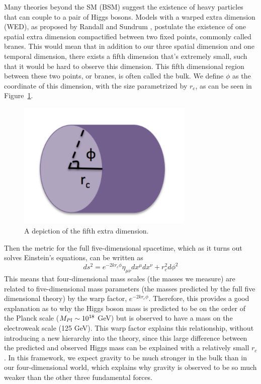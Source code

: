 Many theories beyond the SM (BSM) suggest \ifdefined{}\else{ } \fi the existence of heavy particles that can couple to a pair of Higgs bosons. 
Models with a warped extra dimension (WED), as proposed by Randall and Sundrum \cite{Randall:1999ee}, postulate the existence of one spatial extra dimension compactified between two fixed points, commonly called branes. This would mean that in addition to our three spatial dimension and one temporal dimension, there exists a fifth dimension that's extremely small, such that it would be hard to observe this dimension. This fifth dimensional region between these two points, or branes, is often called the bulk. We define $\phi$ as the coordinate of this dimension, with the size parametrized by $r_{c}$, as can be seen in Figure~\ref{Fig:Theory:RSdimension}. 
\begin{figure}
    \centering
        \includegraphics[width=0.75\textwidth]{F2/RSdimension.pdf}
        \caption{A depiction of the fifth extra dimension.}
        \label{Fig:Theory:RSdimension}
\end{figure}
Then the metric for the full five-dimensional spacetime, which as it turns out solves Einstein's equations, can be written as 
\begin{equation}
ds^{2} = e^{-2kr_{c}\phi}\eta_{\mu\nu}dx^{\mu}dx^{\nu} + r^{2}_{c}d\phi^{2} 
\end{equation}
This means that four-dimensional mass scales (the masses we measure) are related to five-dimensional mass parameters (the masses predicted by the full five dimensional theory) by the warp factor, $e^{-2kr_{c}\phi}$. Therefore, this provides a good explanation as to why the Higgs boson mass is predicted to be on the order of the Planck scale ($M_{Pl} \sim 10^{18}$ GeV) but is observed to have a mass on the electroweak scale (125 GeV). This warp factor explains this relationship, without introducing a new hierarchy into the theory, since this large difference between the predicted and observed Higgs mass can be explained with a relatively small $r_{c}$. In this framework, we expect gravity to be much stronger in the bulk than in our four-dimensional world, which explains why gravity is observed to be so much weaker than the other three fundamental forces.

